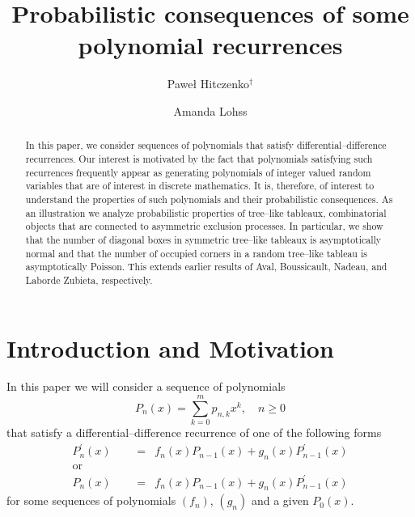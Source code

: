 \documentclass[10pt]{amsart}
\author[Pawe{\l} Hitczenko]{Pawe{\l} Hitczenko${}^\dagger$}
\author[Amanda Lohss]{Amanda Lohss
}
\title[]{Probabilistic consequences of some polynomial recurrences
}
\numberwithin{subcase}{case}
\begin{document}
\maketitle
\begin{abstract}
In this paper, we consider sequences of polynomials that satisfy differential--difference recurrences. Our interest is motivated by the fact that polynomials satisfying such recurrences frequently appear as generating polynomials of integer valued random variables that are of interest in discrete mathematics. It is, therefore, of interest to understand the properties of such polynomials and  their probabilistic consequences. As an illustration   we  analyze  probabilistic properties of  tree--like tableaux, combinatorial objects that are connected to  asymmetric exclusion processes. In particular, we show that the number of diagonal boxes in symmetric tree--like tableaux is asymptotically normal and that the number of occupied corners in a random tree--like tableau is asymptotically Poisson. This extends earlier results of Aval, Boussicault,  Nadeau, and Laborde Zubieta, respectively.

\end{abstract}

\section{Introduction and Motivation}\label{sec:mot} 
In this paper we will consider a sequence of polynomials  \[P_n(x)=\sum_{k=0}^mp_{n,k}x^k,\quad n\ge0\]  
that satisfy a differential--difference recurrence of one of the following forms 
\begin{eqnarray}
\label{rec_prime} P^{'}_n(x)
&=&f_n(x)P_{n-1}(x)+g_n(x)P_{n-1}^{'}(x)\\
\nonumber\mbox{or}\qquad\qquad&&\\
\label{rec}P_n(x)
&=&f_n(x)P_{n-1}(x)+g_n(x)P_{n-1}^{'}(x)
\end{eqnarray}
for some sequences of  polynomials $(f_n)$, $(g_n)$ and a given $P_0(x)$.
 
\end{document}
